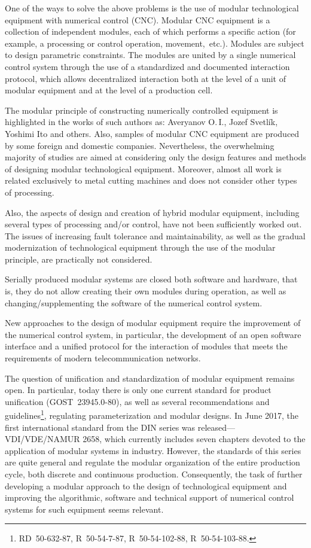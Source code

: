 One of the ways to solve the above problems is the use of modular technological equipment with numerical control (CNC). Modular CNC equipment is a collection of independent modules, each of which performs a specific action (for example, a processing or control operation, movement,~etc.). Modules are subject to design parametric constraints. The modules are united by a single numerical control system through the use of a standardized and documented interaction protocol, which allows decentralized interaction both at the level of a unit of modular equipment and at the level of a production cell.

The modular principle of constructing numerically controlled equipment is highlighted in the works of such authors as: Averyanov O.\,I., Jozef Svetl\'ik, Yoshimi Ito and others. Also, samples of modular CNC equipment are produced by some foreign and domestic companies. Nevertheless, the overwhelming majority of studies are aimed at considering only the design features and methods of designing modular technological equipment. Moreover, almost all work is related exclusively to metal cutting machines and does not consider other types of processing.

Also, the aspects of design and creation of hybrid modular equipment, including several types of processing and/or control, have not been sufficiently worked out. The issues of increasing fault tolerance and maintainability, as well as the gradual modernization of technological equipment through the use of the modular principle, are practically not considered.

Serially produced modular systems are closed both software and hardware, that is, they do not allow creating their own modules during operation, as well as changing/supplementing the software of the numerical control system.

New approaches to the design of modular equipment require the improvement of the numerical control system, in particular, the development of an open software interface and a unified protocol for the interaction of modules that meets the requirements of modern telecommunication networks.

The question of unification and standardization of modular equipment remains open. In particular, today there is only one current standard for product unification (GOST~23945.0-80), as well as several recommendations and guidelines\footnote{RD~50-632-87, R~50-54-7-87, R~50-54-102-88, R~50-54-103-88.}, regulating parameterization and modular designs. In June 2017, the first international standard from the DIN series was released---VDI/VDE/NAMUR 2658, which currently includes seven chapters devoted to the application of modular systems in industry. However, the standards of this series are quite general and regulate the modular organization of the entire production cycle, both discrete and continuous production. Consequently, the task of further developing a modular approach to the design of technological equipment and improving the algorithmic, software and technical support of numerical control systems for such equipment seems relevant.

